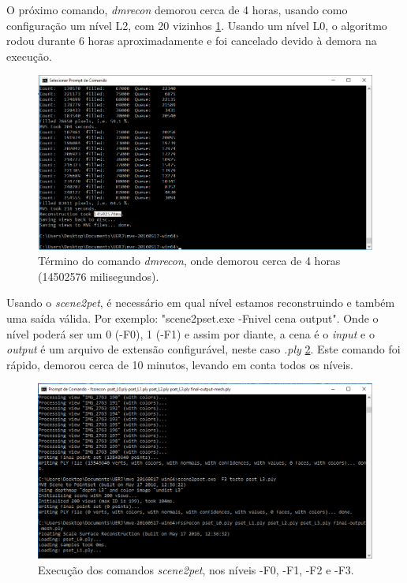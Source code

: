 O próximo comando, {\it dmrecon} demorou cerca de 4 horas, usando como configuração um nível L2, com 20 vizinhos \ref{fig:MVEDenseRecon}. Usando um nível L0, o algoritmo rodou durante 6 horas aproximadamente e foi cancelado devido à demora na execução. 

\begin{figure}[!h]
	\centering
	\includegraphics[width=0.8\linewidth]{figs/umvetempo.png}
	\caption{%
	Término do comando {\it dmrecon}, onde demorou cerca de 4 horas (14502576 milisegundos).
	}\label{fig:MVEDenseRecon}
\end{figure} 

Usando o {\it scene2pet}, é necessário em qual nível estamos reconstruindo e também uma saída válida. Por exemplo: "scene2pset.exe -Fnivel cena output". Onde o nível poderá ser um 0 (-F0), 1 (-F1) e assim por diante, a cena é o {\it input} e o {\it output} é um arquivo de extensão configurável, neste caso {\it .ply} \ref{fig:MVEScene2Pet}. Este comando foi rápido, demorou cerca de 10 minutos, levando em conta todos os níveis.

\begin{figure}[!h]
	\centering
	\includegraphics[width=0.8\linewidth]{figs/mvemesh.png}
	\caption{%
	Execução dos comandos {\it scene2pet}, nos níveis -F0, -F1, -F2 e -F3.
	}\label{fig:MVEScene2Pet}
\end{figure} 


